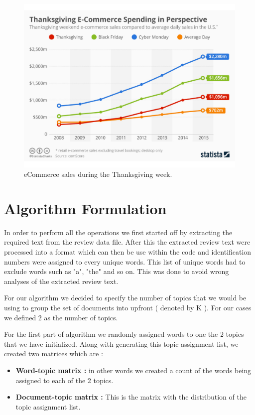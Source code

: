 \documentclass{article}
\begin{document}
\begin{figure}[ht]
	\centerline{\includegraphics[width=\columnwidth]{Thanksgiving_sales}}
	\caption{eCommerce sales during the Thanksgiving week.}
	\label{thanksgiving}
	\vskip 0.15in
\end{figure} 


\section{Algorithm Formulation} 
	\label{algorithm} 

	In order to perform all the operations we first started off by extracting the required text from the review data file. After this 		the extracted review text were processed into a format which can then be use within the code and identification numbers 		were assigned to every unique words. This list of unique words had to exclude words such as "a", "the" and so on. This 		was done to avoid wrong analyses of the extracted review text. 
	
	For our algorithm we decided to specify the number of topics that we would be using to group the set of documents into 		upfront ( denoted by K ). For our cases we defined 2 as the number of topics.

	For the first part of algorithm we randomly assigned words to one the 2 topics that we have initialized. Along with			generating this topic assignment list, we created two matrices which are :
	\begin{itemize}
	 	\item \textbf{Word-topic matrix :} in other words we created a count of the words being assigned to each of the 2 				topics. 
		\item \textbf{Document-topic matrix :} This is the matrix with the distribution of the topic assignment list.
	\end{itemize}
	
\end{document}

